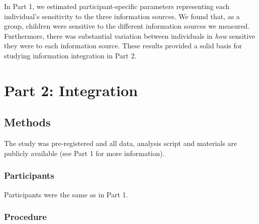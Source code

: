 \documentclass[
  man,mask,floatsintext]{apa6}
\begin{document}
In Part 1, we estimated participant-specific parameters representing each individual's sensitivity to the three information sources. We found that, as a group, children were sensitive to the different information sources we measured. Furthermore, there was substantial variation between individuals in \emph{how} sensitive they were to each information source. These results provided a solid basis for studying information integration in Part 2.

\hypertarget{part-2-integration}{%
\section{Part 2: Integration}\label{part-2-integration}}

\hypertarget{methods-1}{%
\subsection{Methods}\label{methods-1}}

The study was pre-registered and all data, analysis script and materials are publicly available (see Part 1 for more information).

\hypertarget{participants-1}{%
\subsubsection{Participants}\label{participants-1}}

Participants were the same as in Part 1.

\hypertarget{procedure}{%
\subsubsection{Procedure}\label{procedure}}
\end{document}
